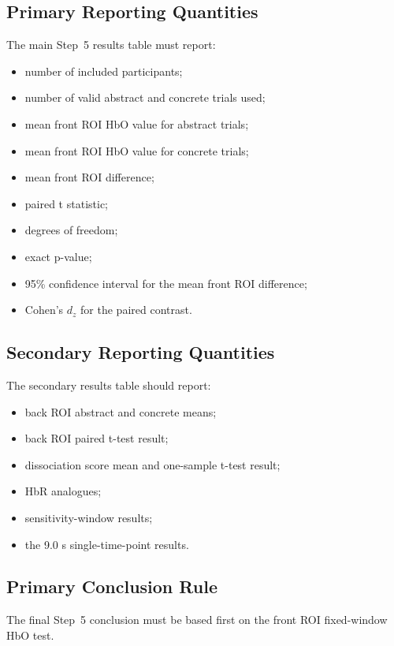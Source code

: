\subsection{Primary Reporting Quantities}
The main Step~5 results table must report:
\begin{itemize}
    \item number of included participants;
    \item number of valid abstract and concrete trials used;
    \item mean front ROI HbO value for abstract trials;
    \item mean front ROI HbO value for concrete trials;
    \item mean front ROI difference;
    \item paired t statistic;
    \item degrees of freedom;
    \item exact p-value;
    \item 95\% confidence interval for the mean front ROI difference;
    \item Cohen's \(d_z\) for the paired contrast.
\end{itemize}

\subsection{Secondary Reporting Quantities}
The secondary results table should report:
\begin{itemize}
    \item back ROI abstract and concrete means;
    \item back ROI paired t-test result;
    \item dissociation score mean and one-sample t-test result;
    \item HbR analogues;
    \item sensitivity-window results;
    \item the 9.0 s single-time-point results.
\end{itemize}

\subsection{Primary Conclusion Rule}
The final Step~5 conclusion must be based first on the front ROI fixed-window HbO test.

